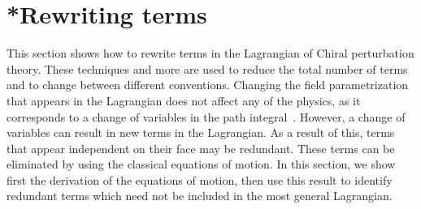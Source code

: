 \section{*Rewriting terms}
\label{appendix: rewriting terms}

This section shows how to rewrite terms in the Lagrangian of Chiral perturbation theory.
These techniques and more are used to reduce the total number of terms and to change between different conventions.
Changing the field parametrization that appears in the Lagrangian does not affect any of the physics, as it corresponds to a change of variables in the path integral~\autocite{chisholmChangeVariablesQuantum1961,kamefuchiChangeVariablesEquivalence1961,schererIntroductionChiralPerturbation2002}.
However, a change of variables can result in new terms in the Lagrangian.
As a result of this, terms that appear independent on their face may be redundant.
These terms can be eliminated by using the classical equations of motion.
In this section, we show first the derivation of the equations of motion, then use this result to identify redundant terms which need not be included in the most general Lagrangian.

